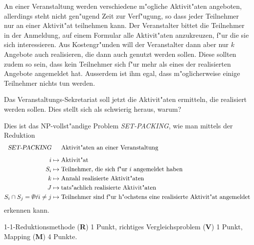 An einer Veranstaltung werden verschiedene m"ogliche Aktivit"aten angeboten,
allerdings steht nicht gen"ugend Zeit zur Verf"ugung, so dass jeder
Teilnehmer nur an einer Aktivit"at teilnehmen kann.
Der Veranstalter bittet die Teilnehmer in der Anmeldung, auf einem
Formular alle Aktivit"aten anzukreuzen, f"ur die sie sich interessieren.
Aus Kostengr"unden will der Veranstalter dann aber nur $k$ Angebote
auch realisieren, die dann auch genutzt werden sollen.
Diese sollten zudem so sein, dass kein Teilnehmer sich f"ur mehr als
eines der realisierten Angebote angemeldet hat.
Ausserdem ist ihm egal, dass m"oglicherweise einige Teilnehmer nichts tun
werden.

Das Veranstaltungs-Sekretariat soll jetzt die Aktivit"aten ermitteln, 
die realisiert werden sollen.
Dies stellt sich als schwierig heraus, warum?

\begin{loesung}
Dies ist das NP-vollst"andige Problem \textsl{SET-PACKING}, wie man 
mittels der Reduktion
\begin{align*}
\textsl{SET-PACKING}&\phantom{\mathstrut\mapsto\mathstrut}\textrm{Aktivit"aten an einer Veranstaltung}
\\[5pt]
i&\mapsto \textrm{Aktivit"at}
\\
S_i&\mapsto \textrm{Teilnehmer, die sich f"ur $i$ angemeldet haben}
\\
k&\mapsto \textrm{Anzahl realisierte Aktivit"aten}
\\
J&\mapsto \textrm{tats"achlich realisierte Aktivit"aten}
\\
S_i\cap S_j=\emptyset\forall i\ne j
&\mapsto \textrm{Teilnehmer sind f"ur h"ochstens eine realisierte Aktivit"at angemeldet}
\end{align*}
erkennen kann.
\end{loesung}

\begin{bewertung}
1-1-Reduktionsmethode ({\bf R}) 1 Punkt,
richtiges Vergleichsproblem ({\bf V}) 1 Punkt,
Mapping ({\bf M}) 4 Punkte.
\end{bewertung}

